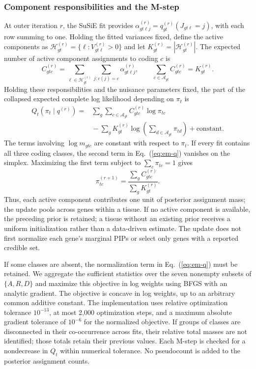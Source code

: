 \documentclass[12pt]{article}
\begin{document}
\subsubsection*{Component responsibilities and the M-step}
At outer iteration $r$, the SuSiE fit provides
$\alpha_{gt\ell j}^{(r)}=q_{gt}^{(r)}(J_{gt\ell}=j)$, with each row summing
to one. Holding the fitted variances fixed, define the active components
as $\mathcal{H}_{gt}^{(r)}=\{\ell:V_{gt\ell}^{(r)}>0\}$ and let
$K_{gt}^{(r)}=|\mathcal{H}_{gt}^{(r)}|$. The expected number of active
component assignments to coding $c$ is
\begin{equation}
 C_{gtc}^{(r)}
 =\sum_{\ell\in\mathcal{H}_{gt}^{(r)}}\sum_{j:c(j)=c}\alpha_{gt\ell j}^{(r)},
 \qquad \sum_{c\in\mathcal{A}_{gt}}C_{gtc}^{(r)}=K_{gt}^{(r)}.
 \label{eq:em-counts}
\end{equation}
Holding these responsibilities and the nuisance parameters fixed, the
part of the collapsed expected complete log likelihood depending on $\pi_t$ is
\begin{equation}
 \begin{array}{rl}
 Q_t(\pi_t\mid q^{(r)})={}&
 \displaystyle\sum_g\sum_{c\in\mathcal{A}_{gt}}
 C_{gtc}^{(r)}\log\pi_{tc}\\[6pt]
 &\displaystyle{}-\sum_g K_{gt}^{(r)}
 \log\left(\sum_{d\in\mathcal{A}_{gt}}\pi_{td}\right)
 +\mathrm{constant}.
 \end{array}
 \label{eq:em-q}
\end{equation}
The terms involving $\log m_{gtc}$ are constant with respect to $\pi_t$.
If every fit contains all three coding classes, the second term in
Eq.~(\ref{eq:em-q}) vanishes on the simplex. Maximizing the first term
subject to $\sum_c\pi_{tc}=1$ gives
\begin{equation}
 \pi_{tc}^{(r+1)}
 =\frac{\sum_g C_{gtc}^{(r)}}{\sum_g K_{gt}^{(r)}}.
 \label{eq:em-closed-update}
\end{equation}
Thus, each active component contributes one unit of posterior assignment
mass; the update pools across genes within a tissue. If no active component
is available, the preceding prior is retained; a tissue without an existing
prior receives a uniform initialization rather than a data-driven estimate.
The update does not first
normalize each gene's marginal PIPs or select only genes with a reported
credible set.

If some classes are absent, the normalization term in
Eq.~(\ref{eq:em-q}) must be retained. We aggregate the sufficient statistics
over the seven nonempty subsets of $\{A,R,D\}$ and maximize this objective
in log weights using BFGS with an analytic gradient. The objective is
concave in log weights, up to an arbitrary common additive constant.
The implementation uses relative optimization tolerance $10^{-13}$,
at most 2,000 optimization steps, and a maximum absolute gradient
tolerance of $10^{-6}$ for the normalized objective. If groups of classes
are disconnected in their
co-occurrence across fits, their relative total masses are not
identified; those totals retain their previous values. Each M-step is
checked for a nondecrease in $Q_t$ within numerical tolerance. No
pseudocount is added to the posterior assignment counts.
\end{document}
